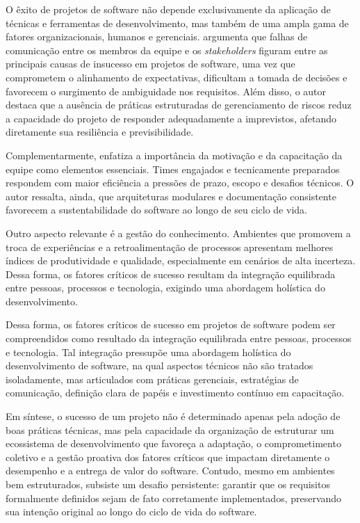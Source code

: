 O êxito de projetos de software não depende exclusivamente da aplicação de técnicas e ferramentas de desenvolvimento, mas também de uma ampla gama de fatores organizacionais, humanos e gerenciais.  argumenta que falhas de comunicação entre os membros da equipe e os \textit{stakeholders} figuram entre as principais causas de insucesso em projetos de software, uma vez que comprometem o alinhamento de expectativas, dificultam a tomada de decisões e favorecem o surgimento de ambiguidade nos requisitos. Além disso, o autor destaca que a ausência de práticas estruturadas de gerenciamento de riscos reduz a capacidade do projeto de responder adequadamente a imprevistos, afetando diretamente sua resiliência e previsibilidade.

Complementarmente,  enfatiza a importância da motivação e da capacitação da equipe como elementos essenciais. Times engajados e tecnicamente preparados respondem com maior eficiência a pressões de prazo, escopo e desafios técnicos. O autor ressalta, ainda, que arquiteturas modulares e documentação consistente favorecem a sustentabilidade do software ao longo de seu ciclo de vida.

Outro aspecto relevante é a gestão do conhecimento. Ambientes que promovem a troca de experiências e a retroalimentação de processos apresentam melhores índices de produtividade e qualidade, especialmente em cenários de alta incerteza. Dessa forma, os fatores críticos de sucesso resultam da integração equilibrada entre pessoas, processos e tecnologia, exigindo uma abordagem holística do desenvolvimento.

Dessa forma, os fatores críticos de sucesso em projetos de software podem ser compreendidos como resultado da integração equilibrada entre pessoas, processos e tecnologia. Tal integração pressupõe uma abordagem holística do desenvolvimento de software, na qual aspectos técnicos não são tratados isoladamente, mas articulados com práticas gerenciais, estratégias de comunicação, definição clara de papéis e investimento contínuo em capacitação.

Em síntese, o sucesso de um projeto não é determinado apenas pela adoção de boas práticas técnicas, mas pela capacidade da organização de estruturar um ecossistema de desenvolvimento que favoreça a adaptação, o comprometimento coletivo e a gestão proativa dos fatores críticos que impactam diretamente o desempenho e a entrega de valor do software. Contudo, mesmo em ambientes bem estruturados, subsiste um desafio persistente: garantir que os requisitos formalmente definidos sejam de fato corretamente implementados, preservando sua intenção original ao longo do ciclo de vida do software. 

